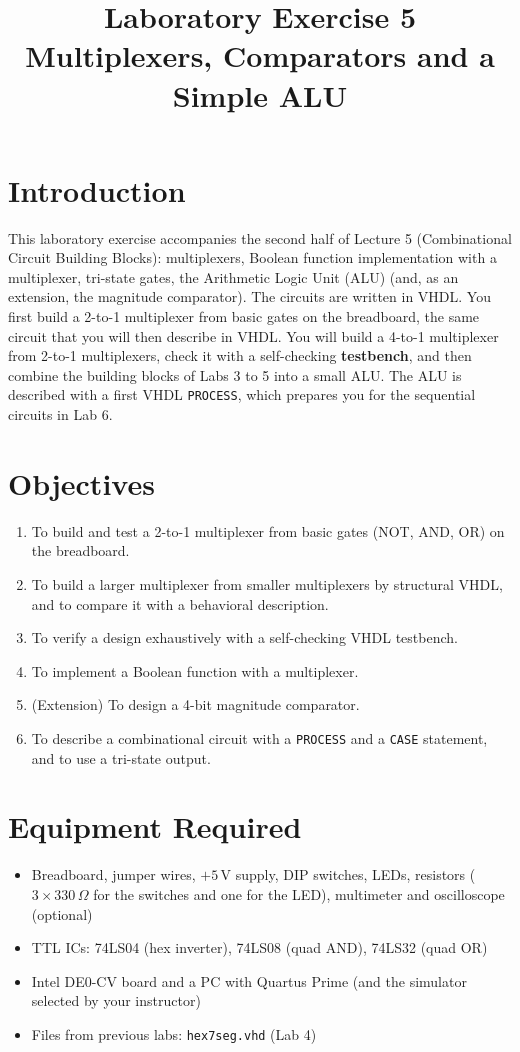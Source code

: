 \documentclass{article}
\title{Laboratory Exercise 5 \\ Multiplexers, Comparators and a Simple ALU}
\author{}
\date{}
\begin{document}
\maketitle

\section*{Introduction}
This laboratory exercise accompanies the second half of Lecture 5 (Combinational Circuit Building Blocks): multiplexers, Boolean function implementation with a multiplexer, tri-state gates, the Arithmetic Logic Unit (ALU) (and, as an extension, the magnitude comparator). The circuits are written in VHDL. You first build a 2-to-1 multiplexer from basic gates on the breadboard, the same circuit that you will then describe in VHDL. You will build a 4-to-1 multiplexer from 2-to-1 multiplexers, check it with a self-checking \textbf{testbench}, and then combine the building blocks of Labs 3 to 5 into a small ALU. The ALU is described with a first VHDL \texttt{PROCESS}, which prepares you for the sequential circuits in Lab 6.

\section*{Objectives}
\begin{enumerate}
    \item To build and test a 2-to-1 multiplexer from basic gates (NOT, AND, OR) on the breadboard.
    \item To build a larger multiplexer from smaller multiplexers by structural VHDL, and to compare it with a behavioral description.
    \item To verify a design exhaustively with a self-checking VHDL testbench.
    \item To implement a Boolean function with a multiplexer.
    \item (Extension) To design a 4-bit magnitude comparator.
    \item To describe a combinational circuit with a \texttt{PROCESS} and a \texttt{CASE} statement, and to use a tri-state output.
\end{enumerate}

\section*{Equipment Required}
\begin{itemize}
    \item Breadboard, jumper wires, $+5\,\mathrm{V}$ supply, DIP switches, LEDs, resistors ($3\times 330\,\Omega$ for the switches and one for the LED), multimeter and oscilloscope (optional)
    \item TTL ICs: 74LS04 (hex inverter), 74LS08 (quad AND), 74LS32 (quad OR)
    \item Intel DE0-CV board and a PC with Quartus Prime (and the simulator selected by your instructor)
    \item Files from previous labs: \texttt{hex7seg.vhd} (Lab 4)
\end{itemize}
\end{document}
